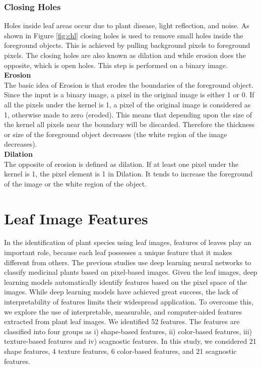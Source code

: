 \documentclass{article}
\begin{document}
\hypertarget{closing-holes}{%
\subsubsection{Closing Holes}\label{closing-holes}}

Holes inside leaf areas occur due to plant disease, light
reflection, and noise. As shown in Figure \ref{fig:chl} closing holes is used to
remove small holes inside the foreground objects. This is achieved by
pulling background pixels to foreground pixels. The closing holes are also
known as dilation and while erosion does the opposite,  which is open
holes. This step is performed on a binary image.\\

\textbf{Erosion}\\

The basic idea of Erosion is that erodes the boundaries of
the foreground object. Since the input is a binary image, a pixel in the
original image is either 1 or 0. If all the pixels under the kernel is
1, a pixel of the original image is considered as 1, otherwise made to zero
(eroded). This means that depending upon the size of the kernel all
pixels near the boundary will be discarded. Therefore the thickness or size
of the foreground object decreases (the white region of the image
decreases).\\

\textbf{Dilation}\\

The opposite of erosion is defined as dilation. If at least one pixel
under the kernel is 1, the pixel element is 1 in Dilation. It tends to
increase the foreground of the image or the white region of the object.

\hypertarget{leaf-image-features}{%
\section{Leaf Image Features}\label{leaf-image-features}}


In the identification of plant species using leaf images, features of
leaves play an important role, because each leaf possesses a unique feature
that it makes different from others. The previous studies \citep{articlepl, article7, sun2017deep} use deep
learning neural networks to classify medicinal plants based on
pixel-based images. Given the leaf images, deep learning models
automatically identify features based on the pixel space of the images.
While deep learning models have achieved great success, the lack of
interpretability of features limits their widespread application. To
overcome this, we explore the use of interpretable, measurable, and
computer-aided features extracted from plant leaf images. We identified
52 features. The features are classified into four groups as i)
shape-based features, ii) color-based features, iii) texture-based
features and iv) scagnostic features. In this study, we considered 21 shape features, 4 texture features, 6 color-based features, and 21 scagnostic features.
\end{document}
